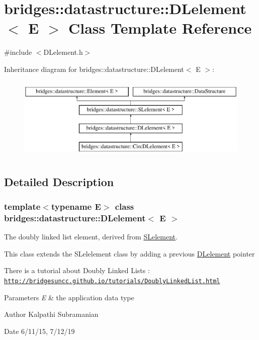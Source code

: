 \hypertarget{classbridges_1_1datastructure_1_1_d_lelement}{}\section{bridges\+:\+:datastructure\+:\+:D\+Lelement$<$ E $>$ Class Template Reference}
\label{classbridges_1_1datastructure_1_1_d_lelement}


{\ttfamily \#include $<$D\+Lelement.\+h$>$}

Inheritance diagram for bridges\+:\+:datastructure\+:\+:D\+Lelement$<$ E $>$\+:\begin{figure}[H]
\begin{center}
\leavevmode
\includegraphics[height=4.000000cm]{classbridges_1_1datastructure_1_1_d_lelement}
\end{center}
\end{figure}


\subsection{Detailed Description}
\subsubsection*{template$<$typename E$>$\newline
class bridges\+::datastructure\+::\+D\+Lelement$<$ E $>$}

The doubly linked list element, derived from \mbox{\hyperlink{classbridges_1_1datastructure_1_1_s_lelement}{S\+Lelement}}. 

This class extends the S\+Lelelement class by adding a previous \mbox{\hyperlink{classbridges_1_1datastructure_1_1_d_lelement}{D\+Lelement}} pointer

There is a tutorial about Doubly Linked Lists \+: \href{http://bridgesuncc.github.io/tutorials/DoublyLinkedList.html}{\tt http\+://bridgesuncc.\+github.\+io/tutorials/\+Doubly\+Linked\+List.\+html}


\begin{DoxyParams}{Parameters}
{\em E} & the application data type\\
\hline
\end{DoxyParams}
\begin{DoxyAuthor}{Author}
Kalpathi Subramanian 
\end{DoxyAuthor}
\begin{DoxyDate}{Date}
6/11/15, 7/12/19 
\end{DoxyDate}
